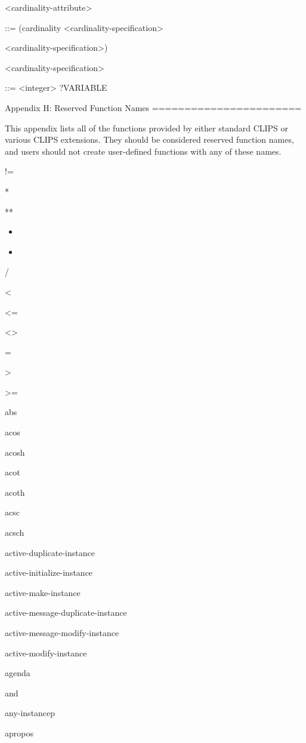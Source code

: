 \documentclass[letterpaper,10pt,english]{sphinxmanual}
\begin{document}
\textless{}cardinality-attribute\textgreater{}

::= (cardinality \textless{}cardinality-specification\textgreater{}

\textless{}cardinality-specification\textgreater{})

\textless{}cardinality-specification\textgreater{}

::= \textless{}integer\textgreater{} \textbar{} ?VARIABLE

Appendix H:
Reserved Function Names
=======================

This appendix lists all of the functions provided by either standard
CLIPS or various CLIPS extensions. They should be considered reserved
function names, and users should not create user-defined functions with
any of these names.

!=

*

**
\begin{itemize}
\item {} 
\end{itemize}
\begin{itemize}
\item {} 
\end{itemize}

/

\textless{}

\textless{}=

\textless{}\textgreater{}

=

\textgreater{}

\textgreater{}=

abs

acos

acosh

acot

acoth

acsc

acsch

active-duplicate-instance

active-initialize-instance

active-make-instance

active-message-duplicate-instance

active-message-modify-instance

active-modify-instance

agenda

and

any-instancep

apropos
\end{document}
